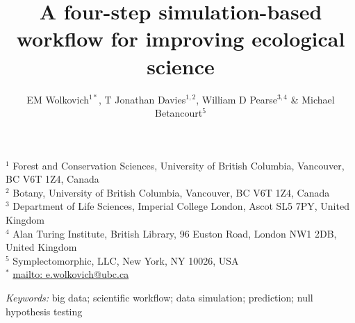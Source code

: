 \documentclass[11pt]{article}
\begin{document}

\renewcommand{\refname}{\CHead{}}


\title{A four-step simulation-based workflow for improving ecological science}
\author{EM Wolkovich$^{1*}$, T Jonathan Davies$^{1,2}$, William D Pearse$^{3,4}$ \& Michael Betancourt$^{5}$}
\maketitle

\noindent $^{1}$ Forest and Conservation Sciences, University of British Columbia, Vancouver, BC V6T 1Z4, Canada\\
$^{2}$ Botany, University of British Columbia, Vancouver, BC V6T 1Z4, Canada\\
$^{3}$ Department of Life Sciences, Imperial College London, Ascot SL5 7PY, United Kingdom \\
$^{4}$ Alan Turing Institute, British Library, 96 Euston Road, London NW1 2DB, United Kingdom \\
$^{5}$ Symplectomorphic, LLC, New York, NY 10026, USA \\
$^{*}$ \url{mailto: e.wolkovich@ubc.ca}
 
\vspace{3ex}
\noindent \emph{Keywords:} big data; scientific workflow; data simulation; prediction; null hypothesis testing
\vspace{3ex}
\end{document}
